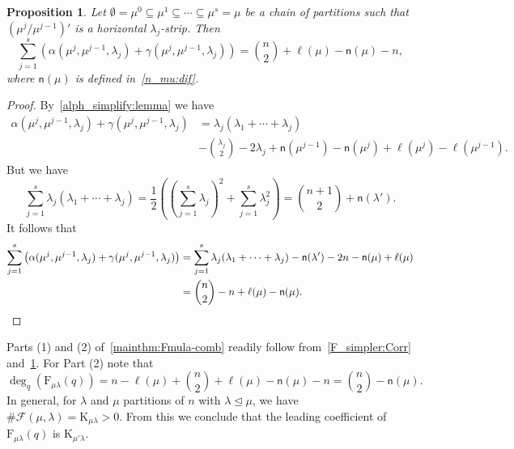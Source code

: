 \documentclass[12pt,a4paper,reqno]{amsart}
\theoremstyle{plain}
\newtheorem{proposition}[theorem]{Proposition}
\theoremstyle{definition}
\newcommand{\less}{\unlhd}
\newcommand{\1}{\mathds{1}}
\newcommand{\F}{\mathrm{F}}
\newcommand{\K}{{\mathrm{K}}}
\newcommand{\fn}{\mathsf{n}}
\begin{document}
\begin{proposition}\label{Simplify:prop} Let $\emptyset=\mu^{0}\subseteq \mu^{1}\subseteq \cdots\subseteq \mu^{s}=\mu$ be a chain of partitions such that $(\mu^{j}/\mu^{j-1})'$ is a horizontal $\lambda_j$-strip. Then
$$
\sum_{j=1}^s \left(\alpha(\mu^j,\mu^{j-1},\lambda_j)+\gamma(\mu^j,\mu^{j-1},\lambda_j)\right)=\binom{n}{2}+\ell(\mu)-\fn(\mu)-n,
$$
where $\fn(\mu)$ is defined in~\cref{n_mu:dif}. 
\end{proposition}
\begin{proof}
By~\cref{alph_simplify:lemma} we have
\begin{align*}
\alpha(\mu^j,\mu^{j-1},\lambda_j)+\gamma(\mu^j,\mu^{j-1},\lambda_j)
&=
\lambda_j(\lambda_1+\cdots +\lambda_j)\\
&-\binom{\lambda_j}{2}-2\lambda_j+\fn(\mu^{j-1})-\fn(\mu^{j})+\ell(\mu^j)-\ell(\mu^{j-1}).
\end{align*}
But we have 
\[
\sum_{j=1}^s\lambda_j(\lambda_1+\cdots+\lambda_j)=
\frac{1}{2}
\left(\left(\sum_{j=1}^s\lambda_j\right)
^2+\sum_{j=1}^s\lambda_j^2\right)
=\binom{n+1}{2}+\fn(\lambda').
\]
It follows that 
\begin{align*}
\sum_{j=1}^s \big(\alpha(\mu^j,\mu^{j-1},\lambda_j)+\gamma(\mu^j,\mu^{j-1},\lambda_j)\big)
&=
\sum_{j=1}^s\lambda_j(\lambda_1+\cdots+\lambda_j)-\fn(\lambda')-2n
-\fn(\mu)+\ell(\mu)\\
&
=\binom{n}{2}-n+\ell(\mu)-\fn(\mu).
\qedhere\end{align*}
\end{proof}
Parts (1) and (2) of~\cref{mainthm:Fmula-comb} readily follow from~\cref{F_simpler:Corr} and~\cref{Simplify:prop}. For Part (2) note that 
$$
\deg_q\left( \F_{\mu\lambda}(q)\right)=n-\ell(\mu)+\binom{n}{2}+\ell(\mu)-\fn(\mu)-n=\binom{n}{2}-\fn(\mu).
$$
In general, for $\lambda$ and $\mu$ partitions of $n$ with $\lambda \less \mu$, we have $\# \mathcal{F}(\mu,\lambda) =\K_{\mu\lambda}>0$.
From this we conclude that the leading coefficient of $\F_{\mu\lambda}(q)$ is $\K_{\mu'\lambda}$.







\end{document}
